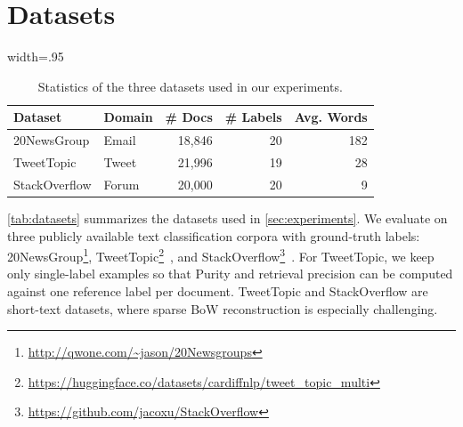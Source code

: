 \documentclass{article}
\theoremstyle{plain}
\theoremstyle{definition}
\theoremstyle{remark}
\begin{document}





\appendix

\section{Datasets}
\label{sec:dataset-details}

\begin{table}[h]
\centering
\begin{adjustbox}{width=.95\linewidth}
\begin{tabular}{@{}llrrr@{}}
\toprule
Dataset & Domain & \# Docs & \# Labels & Avg. Words \\
\midrule
20NewsGroup & Email & 18,846 & 20 & 182 \\
TweetTopic & Tweet & 21,996 & 19 & 28 \\
StackOverflow & Forum & 20,000 & 20 & 9 \\
\bottomrule
\end{tabular}
\end{adjustbox}
\caption{Statistics of the three datasets used in our experiments.}
\label{tab:datasets}
\vspace{-1em}
\end{table}

\autoref{tab:datasets} summarizes the datasets used in \autoref{sec:experiments}. We evaluate on three publicly available text classification corpora with ground-truth labels: 20NewsGroup\footnote{\url{http://qwone.com/\~jason/20Newsgroups}}, TweetTopic\footnote{\url{https://huggingface.co/datasets/cardiffnlp/tweet_topic_multi}}~\citep{antypas-etal-2022-twitter}, and StackOverflow\footnote{\url{https://github.com/jacoxu/StackOverflow}}~\citep{xu-etal-2015-short}. For TweetTopic, we keep only single-label examples so that Purity and retrieval precision can be computed against one reference label per document. TweetTopic and StackOverflow are short-text datasets, where sparse BoW reconstruction is especially challenging.
\end{document}
